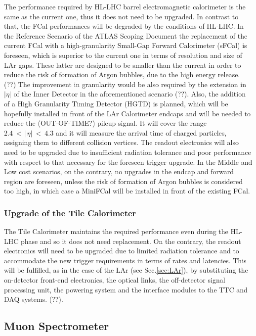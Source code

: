 \documentclass[a4paper,twoside,12pt]{article}
\begin{document}
The performance required by HL-LHC barrel electromagnetic calorimeter is the same as the current one, thus it does not need to be upgraded. In contrast to that, the FCal performances will be degraded by the conditions of HL-LHC. In the Reference Scenario of the ATLAS Scoping Document\cite{scoping} the replacement of the current FCal with a high-granularity Small-Gap Forward Calorimeter (sFCal) is foreseen, which is superior to the current one in terms of resolution and size of LAr gaps. These latter are designed to be smaller than the current in order to reduce the risk of formation of Argon bubbles, due to the high energy release. (??) The improvement in granularity would be also required by the extension in $|\eta|$ of the Inner Detector in the aforementioned scenario (??). Also, the addition of a High Granularity Timing Detector (HGTD) is planned, which will be hopefully installed in front of the LAr Calorimeter endcaps and will be needed to reduce the (OUT-OF-TIME?) pileup signal. It will cover the range $2.4\ <\ |\eta|\ <\ 4.3$ and it will measure the arrival time of charged particles, assigning them to different collision vertices. The readout electronics will also need to be upgraded due to insufficient radiation tolerance and poor performance with respect to that necessary for the foreseen trigger upgrade. In the Middle and Low cost 
scenarios, on the contrary, no upgrades in the endcap and forward region are foreseen, unless the risk of formation of Argon bubbles is considered too high, in which case a MiniFCal will be installed in front of the existing FCal. \\

\subsubsection*{Upgrade of the Tile Calorimeter}

The Tile Calorimeter maintains the required performance even during the HL-LHC phase and
so it does not need replacement. On the contrary, the readout electronics will need to be upgraded due to limited radiation tolerance and to accommodate the new trigger requirements in terms of rates and latencies. This will be fulfilled, as in the case of the LAr (see
Sec.\ref{sec:LAr}), by substituting the on-detector front-end electronics, the optical links, the off-detector signal processing unit, the powering system and the interface modules to the TTC and DAQ systems. (??).

\subsection{Muon Spectrometer}\label{sec:muon}\cite{muon_tdr}\cite{Aad:2008zzm}
\end{document}
